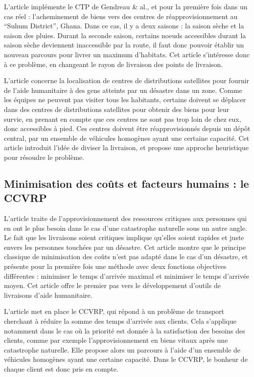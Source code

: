 \documentclass[12pt, a4paper, onecolumn, twoside,french,cleardoublepage=plain,openany]{article}
\begin{document}
L’article \cite{hodgson_covering_1998} implémente le CTP de Gendreau \& al., et pour la première fois dans un cas réel : l’acheminement de biens vers des centres de réapprovisionnement au \enquote{Suhum District}, Ghana. Dans ce cas, il y a deux saisons : la saison sèche et la saison des pluies. Durant la seconde saison, certains noeuds accessibles durant la saison sèche deviennent inaccessible par la route, il faut donc pouvoir établir un nouveau parcours pour livrer un maximum d’habitats. Cet article s’intéresse donc à ce problème, en changeant le rayon de livraison des points de livraison.

L’article \cite{naji-azimi_covering_2012} concerne la localisation de centres de distributions satellites pour fournir de l’aide humanitaire à des gens atteints par un désastre dans un zone. Comme les équipes ne peuvent pas visiter tous les habitants, certains doivent se déplacer dans des centres de distributions satellites pour obtenir des biens pour leur survie, en prenant en compte que ces centres ne sont pas trop loin de chez eux, donc accessibles à pied. Ces centres doivent être réapprovisionnés depuis un dépôt central, par un ensemble de véhicules homogènes ayant une certaine capacité. Cet article introduit l’idée de diviser la livraison, et propose une approche heuristique pour résoudre le problème.


\subsection{Minimisation des coûts et facteurs humains : le CCVRP} \label{CCVRP}

L’article \cite{campbell_routing_2008} traite de l’approvisionnement des ressources critiques aux personnes qui en ont le plus besoin dans le cas d’une catastrophe naturelle sous un autre angle. Le fait que les livraisons soient critiques implique qu’elles soient rapides et juste envers les personnes touchées par un désastre. Cet article montre que le principe classique de minimisation des coûts n’est pas adapté dans le cas d’un désastre, et présente pour la première fois une méthode avec deux fonctions objectives différentes : minimiser le temps d’arrivée maximal et minimiser le temps d’arrivée moyen. Cet article offre le premier pas vers le développement d’outils de livraisons d’aide humanitaire.

L’article \cite{ngueveu_effective_2010} met en place le CCVRP, qui répond à un problème de transport cherchant à réduire la somme des temps d’arrivée aux clients. Cela s’applique notamment dans le cas où la priorité est donnée à la satisfaction des besoins des clients, comme par exemple l’approvisionnement en biens vitaux après une catastrophe naturelle. Elle propose alors un parcours à l’aide d’un ensemble de véhicules homogènes ayant une certaine capacité. Dans le CCVRP, le bonheur de chaque client est donc pris en compte.
\end{document}
